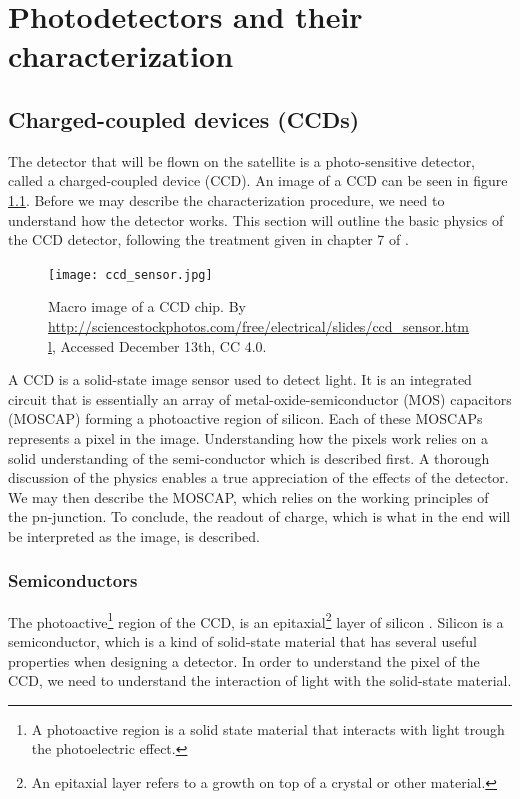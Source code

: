 \documentclass[../main.tex]{subfiles}
\begin{document}
	
	\chapter{Photodetectors and their characterization}\label{chap:theory}
	\section{Charged-coupled devices (CCDs)}\label{sect:CCD}
	The detector that will be flown on the satellite is a photo-sensitive detector, called a charged-coupled device (CCD). An image of a CCD can be seen in figure \ref{fig:CCDchip}. Before we may describe the characterization procedure, we need to understand how the detector works. This section will outline the basic physics of the CCD detector, following the treatment given in chapter 7 of \cite{solidstatephysicsbook}.
	
	\begin{figure}[h!]
		\centering
		\texttt{[image: ccd\_sensor.jpg]}
		\caption{Macro image of a CCD chip. By  \url{http://sciencestockphotos.com/free/electrical/slides/ccd_sensor.html}, Accessed December 13th, CC 4.0.}
		\label{fig:CCDchip}
	\end{figure}
	
	A CCD is a solid-state image sensor used to detect light. It is an integrated circuit that is essentially an array of metal-oxide-semiconductor (MOS) capacitors (MOSCAP) \cite{IEEMOS} forming a photoactive region of silicon. Each of these MOSCAPs represents a pixel in the image. Understanding how the pixels work relies on a solid understanding of the semi-conductor which is described first. A thorough discussion of the physics enables a true appreciation of the effects of the detector. We may then describe the MOSCAP, which relies on the working principles of the pn-junction. To conclude, the readout of charge, which is what in the end will be interpreted as the image, is described.
	
	\subsection{Semiconductors}
	The photoactive\footnote{A photoactive region is a solid state material that interacts with light trough the photoelectric effect.} region of the CCD, is an epitaxial\footnote{An epitaxial layer refers to a growth on top of a crystal or other material.} layer of silicon \cite{comphistmus}. Silicon is a semiconductor, which is a kind of solid-state material that has several useful properties when designing a detector. In order to understand the pixel of the CCD, we need to understand the interaction of light with the solid-state material. 
	
\end{document}
